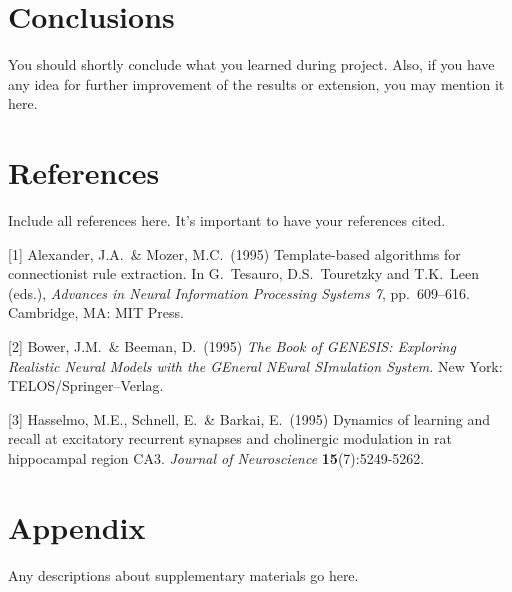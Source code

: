 \documentclass{article}
\begin{document}
\section{Conclusions}
You should shortly conclude what you learned during project. Also, if you have any idea for further improvement of the results or extension, you may mention it here.
	
	


\section*{References}
Include all references here. It’s important to have your references cited.
\medskip
{
\small


[1] Alexander, J.A.\ \& Mozer, M.C.\ (1995) Template-based algorithms for
connectionist rule extraction. In G.\ Tesauro, D.S.\ Touretzky and T.K.\ Leen
(eds.), {\it Advances in Neural Information Processing Systems 7},
pp.\ 609--616. Cambridge, MA: MIT Press.


[2] Bower, J.M.\ \& Beeman, D.\ (1995) {\it The Book of GENESIS: Exploring
  Realistic Neural Models with the GEneral NEural SImulation System.}  New York:
TELOS/Springer--Verlag.


[3] Hasselmo, M.E., Schnell, E.\ \& Barkai, E.\ (1995) Dynamics of learning and
recall at excitatory recurrent synapses and cholinergic modulation in rat
hippocampal region CA3. {\it Journal of Neuroscience} {\bf 15}(7):5249-5262.
}

\section*{Appendix}
Any descriptions about supplementary materials go here.
\end{document}

